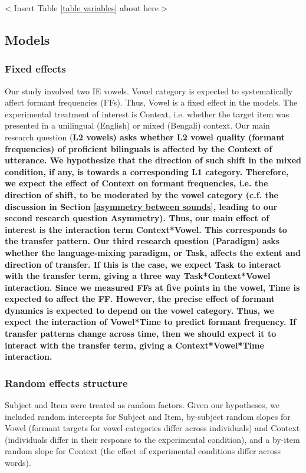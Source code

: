 \documentclass[12 pt]{article}
\begin{document}
< Insert Table \ref{table variables} about here > \\

\subsection{Models}

\subsubsection*{Fixed effects}

Our study involved two IE vowels. Vowel category is expected to systematically affect formant frequencies (FFs). Thus, Vowel is a fixed effect in the models. The experimental treatment of interest is Context, i.e. whether the target item was presented in a unilingual (English) or mixed (Bengali) context. Our main research question (\bf{L2 vowels}) asks whether L2 vowel quality (formant frequencies) of proficient bilinguals is affected by the Context of utterance. We hypothesize that the direction of such shift in the mixed condition, if any, is towards a corresponding L1 category. Therefore, we expect the effect of Context on formant frequencies, i.e. the direction of shift, to be moderated by the vowel category (c.f. the discussion in Section \ref{asymmetry between sounds}, leading to our second research question \textbf{Asymmetry}). Thus, our main effect of interest is the interaction term Context*Vowel. This corresponds to the transfer pattern. Our third research question (\bf{Paradigm}) asks whether the language-mixing paradigm, or Task, affects the extent and direction of transfer. If this is the case, we expect Task to interact with the transfer term, giving a three way Task*Context*Vowel interaction. Since we measured FFs at five points in the vowel, Time is expected to affect the FF. However, the precise effect of formant dynamics is expected to depend on the vowel category. Thus, we expect the interaction of Vowel*Time to predict formant frequency. If transfer patterns change across time, then we should expect it to interact with the transfer term, giving a Context*Vowel*Time interaction.

\subsubsection*{Random effects structure}

Subject and Item were treated as random factors. Given our hypotheses, we included random intercepts for Subject and Item, by-subject random slopes for Vowel (formant targets for vowel categories differ across individuals) and Context (individuals differ in their response to the experimental condition), and a by-item random slope for Context (the effect of experimental conditions differ across words). 
\end{document}
